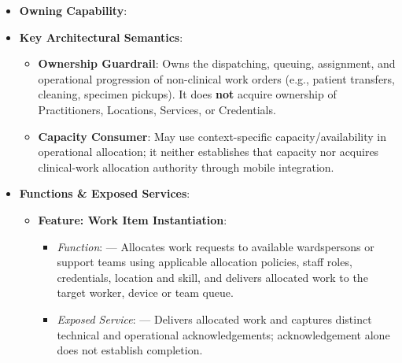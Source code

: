 \begin{itemize}

\item 
\textbf{Owning Capability}: \texttt{}



\item 
\textbf{Key Architectural Semantics}:


\begin{itemize}

\item 
\textbf{Ownership Guardrail}: Owns the dispatching, queuing, assignment, and operational progression of non-clinical work orders (e.g., patient transfers, cleaning, specimen pickups). It does \textbf{not} acquire ownership of Practitioners, Locations, Services, or Credentials.



\item 
\textbf{Capacity Consumer}: May use context-specific capacity/\allowbreak{}availability in operational allocation; it neither establishes that capacity nor acquires clinical-work allocation authority through mobile integration.



\end{itemize}


\item 
\textbf{Functions \& Exposed Services}:


\begin{itemize}

\item 
\textbf{Feature: Work Item Instantiation}:


\begin{itemize}

\item 
\emph{Function}: \texttt{} — Allocates work requests to available wardspersons or support teams using applicable allocation policies, staff roles, credentials, location and skill, and delivers allocated work to the target worker, device or team queue.



\item 
\emph{Exposed Service}: \texttt{} — Delivers allocated work and captures distinct technical and operational acknowledgements; acknowledgement alone does not establish completion.




\end{itemize}
\end{itemize}
\end{itemize}
